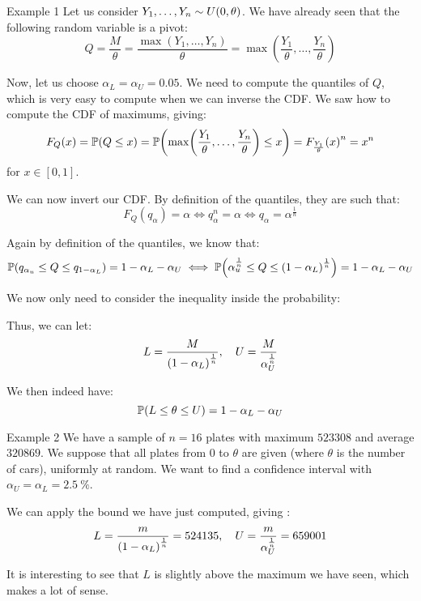 \documentclass[a4paper]{article}
\begin{document}
\begin{parag}{Example 1}
    Let us consider $Y_1, \ldots, Y_n \followsdistr U\left(0, \theta\right)$. We have already seen that the following random variable is a pivot: 
    \[Q = \frac{M}{\theta} = \frac{\max\left(Y_1, \ldots, Y_n\right)}{\theta} = \max\left(\frac{Y_1}{\theta}, \ldots, \frac{Y_n}{\theta}\right)\]
    
    Now, let us choose $\alpha_L = \alpha_U = 0.05$. We need to compute the quantiles of $Q$, which is very easy to compute when we can inverse the CDF. We saw how to compute the CDF of maximums, giving:
    \[F_{Q}\left(x\right) = \prob\left(Q \leq x\right) = \prob\left(\max\left(\frac{Y_1}{\theta}, \ldots, \frac{Y_n}{\theta}\right) \leq x\right) = F_{\frac{Y_1}{\theta}}\left(x\right)^n = x^n\]
    for $x \in \left[0, 1\right]$.

    We can now invert our CDF. By definition of the quantiles, they are such that:
    \[F_{Q}\left(q_{\alpha}\right) = \alpha \iff q_{\alpha}^n = \alpha \iff q_{\alpha} = \alpha^{\frac{1}{n}}\]
    
    Again by definition of the quantiles, we know that: 
    \[\prob\left(q_{\alpha_u} \leq Q \leq q_{1 - \alpha_L}\right) = 1 - \alpha_L -\alpha_U \iff \prob\left(\alpha_u^{\frac{1}{n}} \leq Q \leq \left(1 - \alpha_L\right)^{\frac{1}{n}}\right) = 1 - \alpha_L - \alpha_U\]
    
    We now only need to consider the inequality inside the probability: 

    Thus, we can let: 
    \[L = \frac{M}{\left(1 - \alpha_L\right)^{\frac{1}{n}}}, \mathspace U = \frac{M}{\alpha_U^{\frac{1}{n}}}\]
    
    We then indeed have: 
    \[\prob\left(L \leq \theta \leq U\right) = 1 - \alpha_L - \alpha_U\]
\end{parag}

\begin{parag}{Example 2}
    We have a sample of $n = 16$ plates with maximum $523308$ and average $320869$. We suppose that all plates from 0 to $\theta$ are given (where $\theta$ is the number of cars), uniformly at random. We want to find a confidence interval with $\alpha_U = \alpha_L = \SI{2.5}{\percent}$.

    We can apply the bound we have just computed, giving : 
    \[L = \frac{m}{\left(1 - \alpha_L\right)^{\frac{1}{n}}} = 524135, \mathspace U = \frac{m}{\alpha_U^{\frac{1}{n}}} = 659001\]

    It is interesting to see that $L$ is slightly above the maximum we have seen, which makes a lot of sense.
\end{parag}
\end{document}
